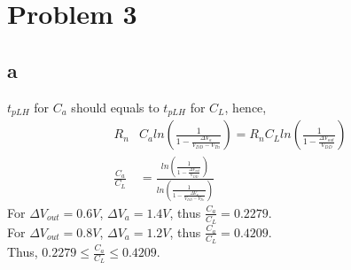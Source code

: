 \documentclass[a4paper,10pt]{article}
\begin{document}
\section*{Problem 3}
\subsection*{a}
\begin{math}t_{pLH}\end{math} for \begin{math}C_a\end{math} should equals to \begin{math}t_{pLH}\end{math} for
\begin{math}C_L\end{math}, hence,
\begin{equation}
\begin{split}
 R_n & C_a ln(\frac{1}{1-\frac{\Delta V_a}{V_{DD} - V_{Tn}}}) = R_n C_L ln(\frac{1}{1-\frac{\Delta V_{out}}{V_{DD}}})\\
 \frac{C_a}{C_L} &= \frac{ln(\frac{1}{1-\frac{\Delta V_{out}}{V_{DD}}})}{ln(\frac{1}{1-\frac{\Delta V_a}{V_{DD} - V_{Tn}}})}
\end{split}
\end{equation}
For \begin{math}\Delta V_{out} = 0.6V\end{math}, \begin{math}\Delta V_a = 1.4V\end{math}, thus 
\begin{math}\frac{C_a}{C_L} = 0.2279\end{math}.\\
For \begin{math}\Delta V_{out} = 0.8V\end{math}, \begin{math}\Delta V_a = 1.2V\end{math}, thus 
\begin{math}\frac{C_a}{C_L} = 0.4209\end{math}.\\
Thus, \begin{math}0.2279 \leq \frac{C_a}{C_L} \leq 0.4209\end{math}.
\end{document}
